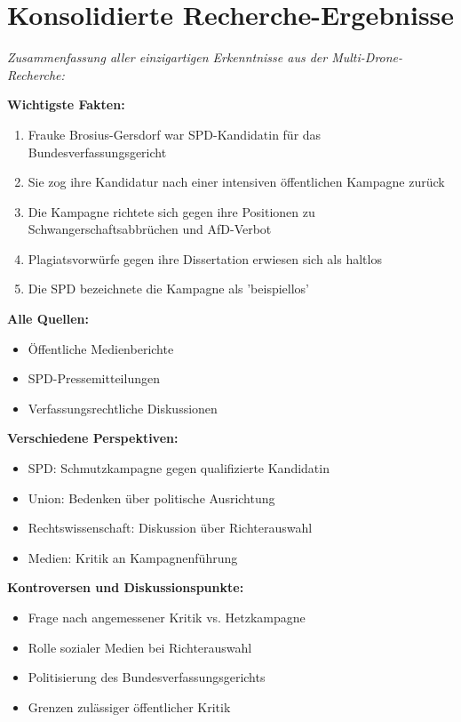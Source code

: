 \documentclass[12pt,a4paper]{article}
\begin{document}
\newpage
\section{Konsolidierte Recherche-Ergebnisse}

\textit{Zusammenfassung aller einzigartigen Erkenntnisse aus der Multi-Drone-Recherche:}

\textbf{Wichtigste Fakten:}
\begin{enumerate}
\item Frauke Brosius-Gersdorf war SPD-Kandidatin für das Bundesverfassungsgericht
\item Sie zog ihre Kandidatur nach einer intensiven öffentlichen Kampagne zurück
\item Die Kampagne richtete sich gegen ihre Positionen zu Schwangerschaftsabbrüchen und AfD-Verbot
\item Plagiatsvorwürfe gegen ihre Dissertation erwiesen sich als haltlos
\item Die SPD bezeichnete die Kampagne als 'beispiellos'
\end{enumerate}

\textbf{Alle Quellen:}
\begin{itemize}
\item Öffentliche Medienberichte
\item SPD-Pressemitteilungen
\item Verfassungsrechtliche Diskussionen
\end{itemize}

\textbf{Verschiedene Perspektiven:}
\begin{itemize}
\item SPD: Schmutzkampagne gegen qualifizierte Kandidatin
\item Union: Bedenken über politische Ausrichtung
\item Rechtswissenschaft: Diskussion über Richterauswahl
\item Medien: Kritik an Kampagnenführung
\end{itemize}

\textbf{Kontroversen und Diskussionspunkte:}
\begin{itemize}
\item Frage nach angemessener Kritik vs. Hetzkampagne
\item Rolle sozialer Medien bei Richterauswahl
\item Politisierung des Bundesverfassungsgerichts
\item Grenzen zulässiger öffentlicher Kritik
\end{itemize}
\end{document}
